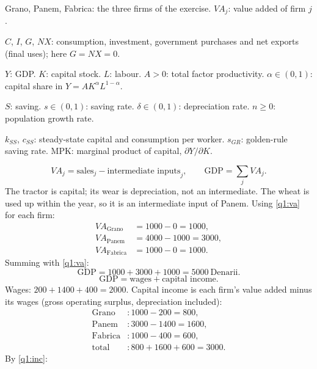 \begin{sol}
\begin{notacao}
\item Grano, Panem, Fabrica: the three firms of the exercise. $VA_j$: value added of firm $j$.
\item $C$, $I$, $G$, $NX$: consumption, investment, government purchases and net exports (final uses); here $G=NX=0$.
\item $Y$: GDP. $K$: capital stock. $L$: labour. $A>0$: total factor productivity. $\alpha\in(0,1)$: capital share in
$Y=AK^\alpha L^{1-\alpha}$.
\item $S$: saving. $s\in(0,1)$: saving rate. $\delta\in(0,1)$: depreciation rate. $n\ge0$: population growth rate.
\item $k_{SS}$, $c_{SS}$: steady-state capital and consumption per worker. $s_{GR}$: golden-rule saving rate.
MPK: marginal product of capital, $\partial Y/\partial K$.
\end{notacao}
\begin{equation}
VA_j=\text{sales}_j-\text{intermediate inputs}_j,\qquad \text{GDP}=\textstyle\sum_j VA_j. \label{q1:va}
\end{equation}
The tractor is capital; its wear is depreciation, not an intermediate. The wheat is used up within the year, so it is an
intermediate input of Panem. Using \eqref{q1:va} for each firm:
\begin{align*}
VA_{\text{Grano}} &= 1000-0=1000,\\
VA_{\text{Panem}} &= 4000-1000=3000,\\
VA_{\text{Fabrica}} &= 1000-0=1000.
\end{align*}
Summing with \eqref{q1:va}:
\[
\text{GDP}=1000+3000+1000=5000\ \text{Denarii}.
\]
\begin{equation}
\text{GDP}=\text{wages}+\text{capital income}. \label{q1:inc}
\end{equation}
Wages: $200+1400+400=2000$. Capital income is each firm's value added minus its wages (gross operating surplus, depreciation
included):
\begin{align*}
\text{Grano} &: 1000-200=800,\\
\text{Panem} &: 3000-1400=1600,\\
\text{Fabrica} &: 1000-400=600,\\
\text{total} &: 800+1600+600=3000.
\end{align*}
By \eqref{q1:inc}:

\end{sol}
